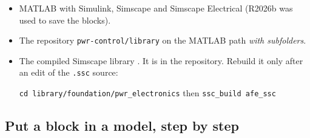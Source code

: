 \documentclass[11pt,a4paper]{scrartcl}
\newcommand{\code}[1]{\texttt{#1}}
\begin{document}
\begin{onehalfspace}
\begin{itemize}[nosep]
	\item MATLAB with Simulink, Simscape and Simscape Electrical (R2026b was used to save the blocks).
	\item The repository \code{pwr-control/library} on the MATLAB path \emph{with subfolders}.
	\item The compiled Simscape library . It is in the repository. Rebuild it only after an edit of the \code{.ssc} source:
	\begin{center}
		\code{cd library/foundation/pwr\_electronics} \quad then \quad \code{ssc\_build afe\_ssc}
	\end{center}
\end{itemize}

\subsection{Put a block in a model, step by step}
\label{sec:steps}


\end{onehalfspace}
\end{document}

